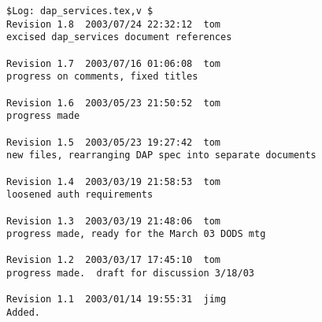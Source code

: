 \documentclass[justify]{dods-paper}
\begin{document}
\begin{verbatim}
$Log: dap_services.tex,v $
Revision 1.8  2003/07/24 22:32:12  tom
excised dap_services document references

Revision 1.7  2003/07/16 01:06:08  tom
progress on comments, fixed titles

Revision 1.6  2003/05/23 21:50:52  tom
progress made

Revision 1.5  2003/05/23 19:27:42  tom
new files, rearranging DAP spec into separate documents

Revision 1.4  2003/03/19 21:58:53  tom
loosened auth requirements

Revision 1.3  2003/03/19 21:48:06  tom
progress made, ready for the March 03 DODS mtg

Revision 1.2  2003/03/17 17:45:10  tom
progress made.  draft for discussion 3/18/03

Revision 1.1  2003/01/14 19:55:31  jimg
Added.

\end{verbatim}
\end{document}
